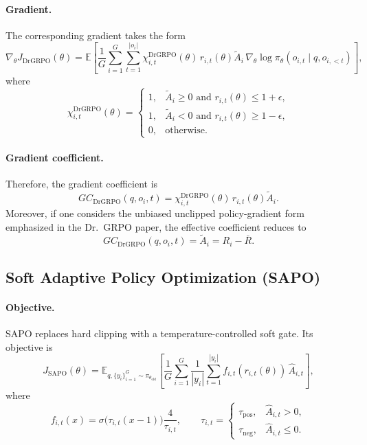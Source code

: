 \documentclass{article}
\begin{document}
\paragraph{Gradient.}
The corresponding gradient takes the form
\begin{equation}
\nabla_\theta J_{\mathrm{DrGRPO}}(\theta)
=
\mathbb{E}
\left[
\frac{1}{G}
\sum_{i=1}^G
\sum_{t=1}^{|o_i|}
\chi^{\mathrm{DrGRPO}}_{i,t}(\theta)\,
r_{i,t}(\theta)\tilde A_i\,
\nabla_\theta \log \pi_\theta(o_{i,t}\mid q,o_{i,<t})
\right],
\label{eq:drgrpo_gradient}
\end{equation}
where
\begin{equation}
\chi^{\mathrm{DrGRPO}}_{i,t}(\theta)
=
\begin{cases}
1, & \tilde A_i \ge 0 \text{ and } r_{i,t}(\theta)\le 1+\epsilon,\\
1, & \tilde A_i < 0 \text{ and } r_{i,t}(\theta)\ge 1-\epsilon,\\
0, & \text{otherwise}.
\end{cases}
\label{eq:drgrpo_indicator}
\end{equation}

\paragraph{Gradient coefficient.}
Therefore, the gradient coefficient is
\begin{equation}
GC_{\mathrm{DrGRPO}}(q,o_i,t)
=
\chi^{\mathrm{DrGRPO}}_{i,t}(\theta)\,
r_{i,t}(\theta)\tilde A_i.
\label{eq:drgrpo_gc}
\end{equation}
Moreover, if one considers the unbiased unclipped policy-gradient form emphasized in the
Dr.\ GRPO paper, the effective coefficient reduces to
\begin{equation}
GC_{\mathrm{DrGRPO}}(q,o_i,t)=\tilde A_i=R_i-\bar R.
\label{eq:drgrpo_gc_unbiased}
\end{equation}

\subsection{Soft Adaptive Policy Optimization (SAPO)}

\paragraph{Objective.}
SAPO replaces hard clipping with a temperature-controlled soft gate. Its objective is
\begin{equation}
J_{\mathrm{SAPO}}(\theta)
=
\mathbb{E}_{q,\{y_i\}_{i=1}^G\sim \pi_{\theta_{\mathrm{old}}}}
\left[
\frac{1}{G}
\sum_{i=1}^G
\frac{1}{|y_i|}
\sum_{t=1}^{|y_i|}
f_{i,t}(r_{i,t}(\theta))\,\hat A_{i,t}
\right],
\label{eq:sapo_objective}
\end{equation}
where
\begin{equation}
f_{i,t}(x)
=
\sigma\!\bigl(\tau_{i,t}(x-1)\bigr)\frac{4}{\tau_{i,t}},
\qquad
\tau_{i,t}
=
\begin{cases}
\tau_{\mathrm{pos}}, & \hat A_{i,t}>0,\\
\tau_{\mathrm{neg}}, & \hat A_{i,t}\le 0.
\end{cases}
\label{eq:sapo_gate}
\end{equation}
\end{document}
